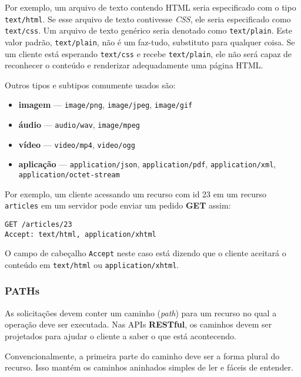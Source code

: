 \documentclass[12pt, a4paper
]{article}
\providecommand{\tightlist}{%
  \setlength{\itemsep}{0pt}\setlength{\parskip}{0pt}}
\begin{document}
Por exemplo, um arquivo de texto contendo HTML seria especificado com o
tipo \texttt{text/html}. Se esse arquivo de texto contivesse \emph{CSS},
ele seria especificado como \texttt{text/css}. Um arquivo de texto
genérico seria denotado como \texttt{text/plain}. Este valor padrão,
\texttt{text/plain}, não é um faz-tudo, substituto para qualquer coisa. Se um cliente está
esperando \texttt{text/css} e recebe \texttt{text/plain}, ele não será
capaz de reconhecer o conteúdo e renderizar adequadamente uma página HTML.

Outros tipos e subtipos comumente usados são:

\begin{itemize}
\tightlist
\item
  \textbf{imagem} --- \texttt{image/png}, \texttt{image/jpeg},
  \texttt{image/gif}
\item
  \textbf{áudio} --- \texttt{audio/wav}, \texttt{image/mpeg}
\item
  \textbf{vídeo} --- \texttt{video/mp4}, \texttt{video/ogg}
\item
  \textbf{aplicação} --- \texttt{application/json},
  \texttt{application/pdf}, \texttt{application/xml},\\
  \texttt{application/octet-stream}
\end{itemize}

Por exemplo, um cliente acessando um recurso com id 23 em um recurso
\texttt{articles} em um servidor pode enviar um pedido \textbf{GET}
assim:

\begin{verbatim}
GET /articles/23
Accept: text/html, application/xhtml
\end{verbatim}

O campo de cabeçalho \texttt{Accept} neste caso está dizendo que o
cliente aceitará o conteúdo em \texttt{text/html} ou
\texttt{application/xhtml}.

\hypertarget{paths}{%
\subsubsection{PATHs}\label{paths}}

As solicitações devem conter um caminho (\emph{path}) para um recurso no
qual a operação deve ser executada. Nas APIs \textbf{RESTful}, os
caminhos devem ser projetados para ajudar o cliente a saber o que está
acontecendo.

Convencionalmente, a primeira parte do caminho deve ser a forma plural
do recurso. Isso mantém os caminhos aninhados simples de ler e fáceis de
entender.
\end{document}

